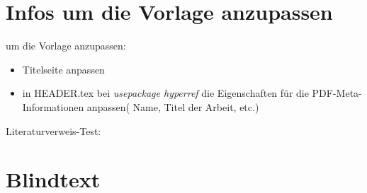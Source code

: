 

\section{Infos um die Vorlage anzupassen}
\todo um die Vorlage anzupassen:
\begin{itemize}
	\item Titelseite anpassen
	\item in HEADER.tex bei \emph{usepackage hyperref} die Eigenschaften für die PDF-Meta-Informationen anpassen( Name, Titel der Arbeit, etc.)
\end{itemize}


Literaturverweis-Test: \cite{gockel2008}




\section{Blindtext} \label{sec:einlXYZ}
\blindtext	%
~ %

\blindtext	%


\blindtext

